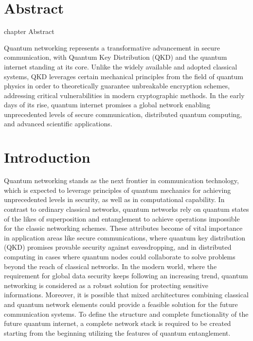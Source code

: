 	\chapter* {Abstract}
	 {chapter} {Abstract}

		Quantum networking represents a transformative advancement in secure communication,
		with Quantum Key Distribution (QKD) and the quantum internet standing at its core.
		Unlike the widely available and adopted classical systems, QKD leverages certain mechanical principles
		from the field of quantum physics in order to theoretically guarantee unbreakable encryption schemes,
		addressing critical vulnerabilities in modern cryptographic methods.
		In the early days of its rise, quantum internet promises a global network enabling unprecedented levels of
		secure communication, distributed quantum computing, and advanced scientific applications.

\tableofcontents

        \chapter{Introduction}

		Quantum networking stands as the next frontier in communication technology,
		which is expected to leverage principles of quantum mechanics for
		achieving unprecedented levels in security, as well as in computational capability.
		In contrast to ordinary classical networks, quantum networks rely on quantum states
		of the likes of superposition and entanglement to achieve operations impossible for
	        the classic networking schemes. These attributes become of vital importance in 
		application areas like secure communications, where quantum key distribution (QKD) 
		promises provable security against eavesdropping, and in distributed computing in cases 
		where quantum nodes could collaborate to solve problems beyond the reach of classical networks.
		In the modern world, where the requirement for global data security keeps following
		an increasing trend, quantum networking is considered as a robust solution
		for protecting sensitive informations.
		Moreover, it is possible that mixed architectures combining classical and quantum network elements
		could provide a feasible solution for the future communication systems. 
		To define the structure and complete functionality of the future quantum internet,
		a complete network stack is required to be created starting from the beginning utilizing 
		the features of quantum entanglement\cite{rfc}.

